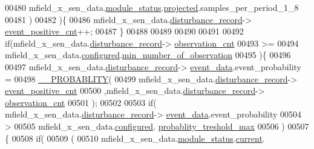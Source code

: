 \begin{DoxyCode}
00480                      mfield\_x\_sen\_data.\hyperlink{a00025_adfab5a5d8b45a93dfb13edb24e2b80e3}{module\_status}.\hyperlink{a00019_af2267fb093fb5dcaa006a570a6da3b6b}{projected}.samples\_per\_period\_1\_8
00481                      )
00482                      )\{
00486                     mfield\_x\_sen\_data.\hyperlink{a00025_ac9b38e2c1d3f1013a88d33506c754152}{disturbance\_record}->
      \hyperlink{a00028_a7397b9d76d4b57500f27bb23d258a18a}{event\_positive\_cnt}++;
00487                    \}
00488 
00489 
00490 
00491 
00492                \textcolor{keywordflow}{if}(mfield\_x\_sen\_data.\hyperlink{a00025_ac9b38e2c1d3f1013a88d33506c754152}{disturbance\_record}->
      \hyperlink{a00028_ad5b0bac02ce266b91b2b52a1c3ea1d78}{observation\_cnt}
00493                 >=
00494                 mfield\_x\_sen\_data.\hyperlink{a00025_a94b2d1f6ea4ab334c74d24984dd27843}{configured}.\hyperlink{a00021_ae8665e8bf422c1482442d6949ba28408}{min\_number\_of\_observation}
00495                  )\{
00496 
00497                     mfield\_x\_sen\_data.\hyperlink{a00025_ac9b38e2c1d3f1013a88d33506c754152}{disturbance\_record}->
      \hyperlink{a00028_a8c0bda69e71ef674e60da47ad0be9ab0}{event\_data}.event\_probability =
00498                            \hyperlink{a00021_ab2185512402ea26115af112ce48175b2}{\_\_PROBABLITY}(
00499                            mfield\_x\_sen\_data.\hyperlink{a00025_ac9b38e2c1d3f1013a88d33506c754152}{disturbance\_record}->
      \hyperlink{a00028_a7397b9d76d4b57500f27bb23d258a18a}{event\_positive\_cnt}
00500                           ,mfield\_x\_sen\_data.\hyperlink{a00025_ac9b38e2c1d3f1013a88d33506c754152}{disturbance\_record}->
      \hyperlink{a00028_ad5b0bac02ce266b91b2b52a1c3ea1d78}{observation\_cnt}
00501                            );
00502 
00503                    \textcolor{keywordflow}{if}( mfield\_x\_sen\_data.\hyperlink{a00025_ac9b38e2c1d3f1013a88d33506c754152}{disturbance\_record}->
      \hyperlink{a00028_a8c0bda69e71ef674e60da47ad0be9ab0}{event\_data}.event\_probability
00504                         >
00505                        mfield\_x\_sen\_data.\hyperlink{a00025_a94b2d1f6ea4ab334c74d24984dd27843}{configured}.
      \hyperlink{a00021_a7e2d217b9c9051d361319180a426851c}{probablity\_treshold\_max}
00506                      )
00507                    \{
00508                           \textcolor{keywordflow}{if}(
00509                             (
00510                             mfield\_x\_sen\_data.\hyperlink{a00025_adfab5a5d8b45a93dfb13edb24e2b80e3}{module\_status}.\hyperlink{a00019_acf41ffc11da291c2f9f0fcb02ee72b98}{current}.

\end{DoxyCode}
